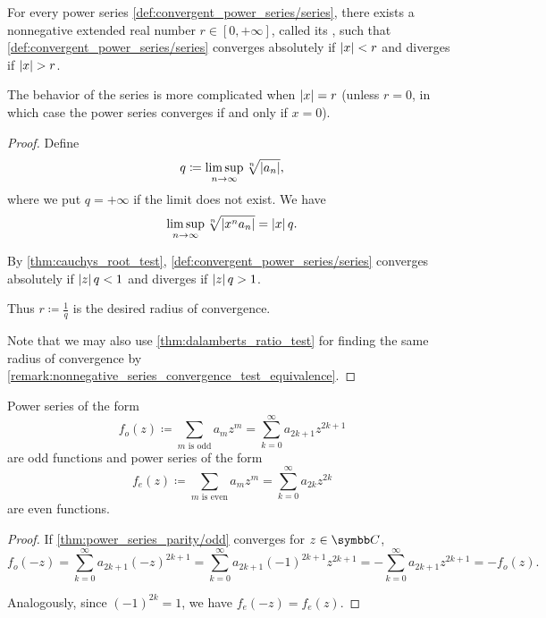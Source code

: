 \begin{theorem}\label{thm:power_series_radius_of_convergence}
  For every power series \cref{def:convergent_power_series/series}, there exists a nonnegative extended real number \( r \in [0, +\infty] \), called its , such that \cref{def:convergent_power_series/series} converges absolutely if \( \left\vert x \right\vert < r \) and diverges if \( \left\vert x \right\vert > r \).

  The behavior of the series is more complicated when \( \left\vert x \right\vert = r \) (unless \( r = 0 \), in which case the power series converges if and only if \( x = 0 \)).
\end{theorem}
\begin{proof}
  Define
  \begin{equation*}
    q \coloneqq \limsup_{n \to \infty} \sqrt[n]{\left\vert a_n \right\vert},
  \end{equation*}
  where we put \( q = +\infty \) if the limit does not exist. We have
  \begin{equation*}
    \limsup_{n \to \infty} \sqrt[n]{\left\vert x^n a_n \right\vert} = \left\vert x \right\vert q.
  \end{equation*}

  By \cref{thm:cauchys_root_test}, \cref{def:convergent_power_series/series} converges absolutely if \( \left\vert z \right\vert q < 1 \) and diverges if \( \left\vert z \right\vert q > 1 \).

  Thus \( r \coloneqq \tfrac 1 q \) is the desired radius of convergence.

  Note that we may also use \cref{thm:dalamberts_ratio_test} for finding the same radius of convergence by \cref{remark:nonnegative_series_convergence_test_equivalence}.
\end{proof}

\begin{proposition}\label{thm:power_series_parity}
  Power series of the form
  \begin{equation}\label{thm:power_series_parity/odd}
    f_o(z) \coloneqq \sum_{m \text{ is odd}} a_m z^m = \sum_{k=0}^\infty a_{2k+1} z^{2k+1}
  \end{equation}
  are odd functions and power series of the form
  \begin{equation}\label{thm:power_series_parity/even}
    f_e(z) \coloneqq \sum_{m \text{ is even}} a_m z^m = \sum_{k=0}^\infty a_{2k} z^{2k}
  \end{equation}
  are even functions.
\end{proposition}
\begin{proof}
  If \cref{thm:power_series_parity/odd} converges for \( z \in \C \),
  \begin{equation*}
    f_o(-z)
    =
    \sum_{k=0}^\infty a_{2k+1} (-z)^{2k+1}
    =
    \sum_{k=0}^\infty a_{2k+1} (-1)^{2k+1} z^{2k+1}
    =
    - \sum_{k=0}^\infty a_{2k+1} z^{2k+1}
    =
    - f_o(z).
  \end{equation*}

  Analogously, since \( (-1)^{2k} = 1 \), we have \( f_e(-z) = f_e(z) \).
\end{proof}
